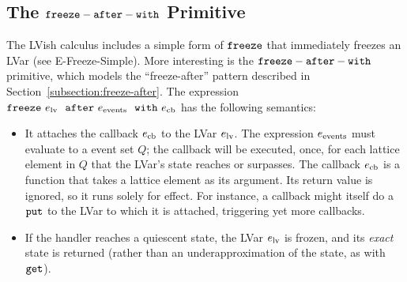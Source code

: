 \subsection{The ${\mbox{\texttt{freeze}}-\mbox{\texttt{after}}-\mbox{\texttt{with}}}$ Primitive}\label{subsection:language-freezing}


The LVish calculus includes a simple form of $\mbox{\texttt{freeze}}$ that immediately
freezes an LVar (see {\sc E-Freeze-Simple}).  
More interesting is the ${\mbox{\texttt{freeze}}-\mbox{\texttt{after}}-\mbox{\texttt{with}}}$ primitive, which
models the ``freeze-after'' pattern described in Section~\ref{subsection:freeze-after}.
The expression $\mbox{\texttt{freeze}}~e_{\rm lv}~~{\mbox{\texttt{after}}}~e_{\rm events}~~{\mbox{\texttt{with}}}~e_{\rm cb}$ has the following semantics:
\begin{itemize}
\item It attaches the callback $e_{\rm cb}$ to the LVar $e_{\rm lv}$.  The
  expression $e_{\rm events}$ must evaluate to a event set $Q$; the callback
  will be executed, once, for each lattice element in $Q$ that the LVar's state
  reaches or surpasses.
The callback $e_{\rm cb}$ is a function that
  takes a lattice element as its argument.  Its return value is ignored, so it
  runs solely for effect.  For instance, a callback might itself do a $\mbox{\texttt{put}}$ to
  the LVar to which it is attached, triggering yet more callbacks.
\item If the handler reaches a quiescent state, the LVar $e_{\rm lv}$
  is frozen, and its \emph{exact} state is returned (rather than an
  underapproximation of the state, as with $\mbox{\texttt{get}}$).
\end{itemize}


